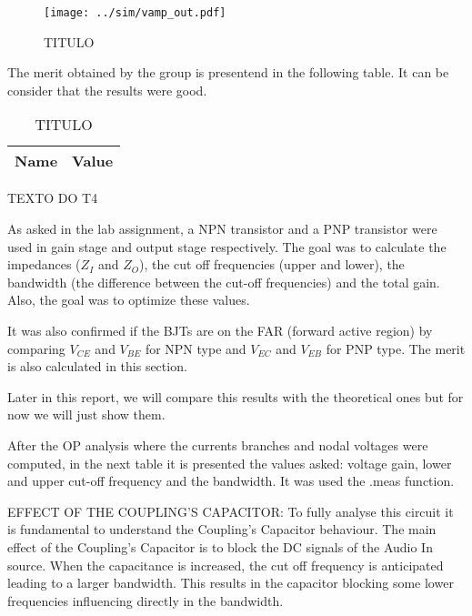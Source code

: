\begin{figure}[H] \centering
\texttt{[image: ../sim/vamp\_out.pdf]}
\caption{TITULO}
\label{fig:ng8}
\end{figure}



\par The merit obtained by the group is presentend in the following table. It can be consider that the results were good.

\begin{table}[!ht]
  \centering
  \begin{tabular}{|l|r|}
    \hline    
    {\bf Name} & {\bf Value} \\ \hline
    
  \end{tabular}
  \caption{TITULO}
  \label{tab:ng5}
\end{table}

TEXTO DO T4

\par As asked in the lab assignment, a NPN transistor and a PNP transistor were used in gain stage and output stage respectively. The goal was to calculate the impedances ($Z_I$ and $Z_O$), the cut off frequencies (upper and lower), the bandwidth (the difference between the cut-off frequencies) and the total gain. Also, the goal was to optimize these values.
\par It was also confirmed if the BJTs are on the FAR (forward active region) by comparing $V_{CE}$ and $V_{BE}$ for NPN type and $V_{EC}$ and $V_{EB}$ for PNP type. The merit is also calculated in this section.
\par Later in this report, we will compare this results with the theoretical ones but for now we will just show them.

\par After the OP analysis where the currents branches and nodal voltages were computed, in the next table it is presented the values asked: voltage gain, lower and upper cut-off frequency and the bandwidth. It was used the .meas function.

\par EFFECT OF THE COUPLING'S CAPACITOR: To fully analyse this circuit it is fundamental to understand the Coupling's Capacitor behaviour. The main effect of the Coupling's Capacitor is to block the DC signals of the Audio In source. When the capacitance is increased, the cut off frequency is anticipated leading to a larger bandwidth. This results in the capacitor blocking some lower frequencies influencing directly in the bandwidth.

